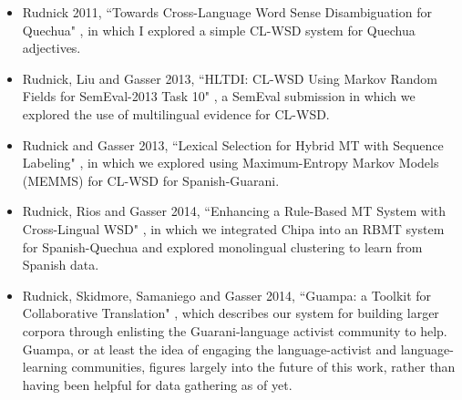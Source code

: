 \begin{itemize}
\item Rudnick 2011, ``Towards Cross-Language Word Sense Disambiguation for
Quechua" \cite{rudnick:2011:RANLPStud}, in which I explored a simple CL-WSD
system for Quechua adjectives.
\item Rudnick, Liu and Gasser 2013, ``HLTDI: CL-WSD Using Markov Random Fields
for SemEval-2013 Task 10" \cite{rudnick-liu-gasser:2013:SemEval-2013}, a
SemEval submission in which we explored the use of multilingual evidence for
CL-WSD.
\item Rudnick and Gasser 2013, ``Lexical Selection for Hybrid MT with Sequence
Labeling" \cite{rudnick-gasser:2013:HyTra}, in which we explored using
Maximum-Entropy Markov Models (MEMMS) for CL-WSD for Spanish-Guarani.
\item Rudnick, Rios and Gasser 2014, ``Enhancing a Rule-Based MT System with
Cross-Lingual WSD" \cite{rudnick:saltmil2014}, in which we integrated Chipa
into an RBMT system for Spanish-Quechua and explored monolingual clustering to
learn from Spanish data.
\item Rudnick, Skidmore, Samaniego and Gasser 2014, ``Guampa: a Toolkit for
Collaborative Translation" \cite{RUDNICK14.151}, which describes our system for
building larger corpora through enlisting the Guarani-language activist
community to help. Guampa, or at least the idea of engaging the
language-activist and language-learning communities, figures largely into the
future of this work, rather than having been helpful for data gathering as of
yet.
\end{itemize}
